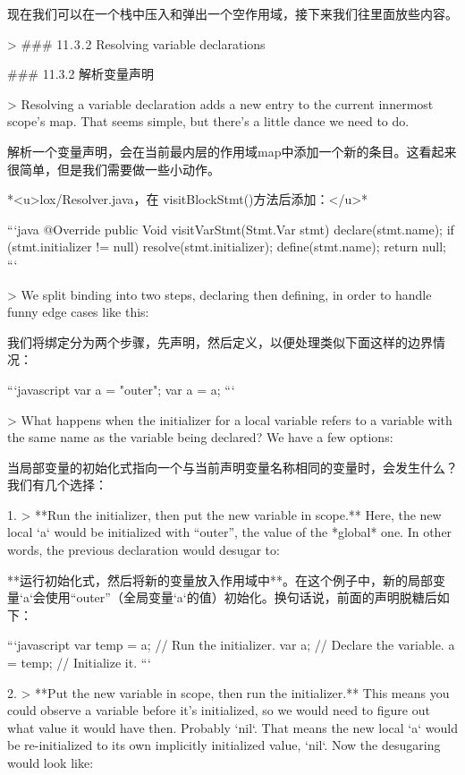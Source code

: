 \documentclass[cn,11pt,chinese]{elegantbook}
\begin{document}
{{{{{{{{{{{{{现在我们可以在一个栈中压入和弹出一个空作用域，接下来我们往里面放些内容。

> ### 11 . 3 . 2 Resolving variable declarations

### 11.3.2 解析变量声明

> Resolving a variable declaration adds a new entry to the current innermost scope’s map. That seems simple, but there’s a little dance we need to do.

解析一个变量声明，会在当前最内层的作用域map中添加一个新的条目。这看起来很简单，但是我们需要做一些小动作。

*<u>lox/Resolver.java，在 visitBlockStmt()方法后添加：</u>*

```java
  @Override
  public Void visitVarStmt(Stmt.Var stmt) {
    declare(stmt.name);
    if (stmt.initializer != null) {
      resolve(stmt.initializer);
    }
    define(stmt.name);
    return null;
  }
```

> We split binding into two steps, declaring then defining, in order to handle funny edge cases like this:

我们将绑定分为两个步骤，先声明，然后定义，以便处理类似下面这样的边界情况：

```javascript
var a = "outer";
{
  var a = a;
}
```

> What happens when the initializer for a local variable refers to a variable with the same name as the variable being declared? We have a few options:

当局部变量的初始化式指向一个与当前声明变量名称相同的变量时，会发生什么？我们有几个选择：

1. > **Run the initializer, then put the new variable in scope.** Here, the new local `a` would be initialized with “outer”, the value of the *global* one. In other words, the previous declaration would desugar to:

   **运行初始化式，然后将新的变量放入作用域中**。在这个例子中，新的局部变量`a`会使用“outer”（全局变量`a`的值）初始化。换句话说，前面的声明脱糖后如下：

   ```javascript
   var temp = a; // Run the initializer.
   var a;        // Declare the variable.
   a = temp;     // Initialize it.
   ```

2. > **Put the new variable in scope, then run the initializer.** This means you could observe a variable before it’s initialized, so we would need to figure out what value it would have then. Probably `nil`. That means the new local `a` would be re-initialized to its own implicitly initialized value, `nil`. Now the desugaring would look like:

}}}}}}}}}}}}}
\end{document}

